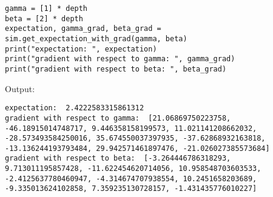 \begin{lstlisting}
gamma = [1] * depth
beta = [2] * depth
expectation, gamma_grad, beta_grad = sim.get_expectation_with_grad(gamma, beta)
print("expectation: ", expectation)
print("gradient with respect to gamma: ", gamma_grad)
print("gradient with respect to beta: ", beta_grad)
\end{lstlisting}
Output:
\begin{lstlisting}
expectation:  2.4222583315861312
gradient with respect to gamma:  [21.06869750223758, -46.18915014748717, 9.446358158199573, 11.021141208662032, -28.573493584250016, 35.674550037397935, -37.62868932163818, -13.136244193793484, 29.942571461897476, -21.026027385573684]
gradient with respect to beta:  [-3.264446786318293, 9.713011195857428, -11.622454620714056, 10.958548703603533, -2.4125637780460947, -4.314674707938554, 10.2451658203689, -9.335013624102858, 7.359235130728157, -1.431435776010227]
\end{lstlisting}
